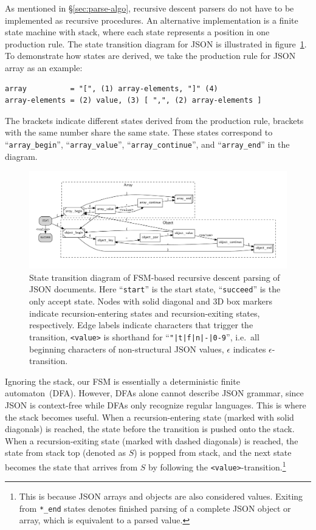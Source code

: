 \documentclass[11pt]{article}
\begin{document}
As mentioned in \S\ref{sec:parse-algo}, recursive descent parsers do not have to be implemented as recursive procedures. An alternative implementation is a finite state machine with stack, where each state represents a position in one production rule. The state transition diagram for JSON is illustrated in figure~\ref{fig:json-fsm}. To demonstrate how states are derived, we take the production rule for JSON array as an example:

\begin{center}
\begin{BVerbatim}  
array          = "[", (1) array-elements, "]" (4)
array-elements = (2) value, (3) [ ",", (2) array-elements ]
\end{BVerbatim}
\end{center}
The brackets indicate different states derived from the production rule, brackets with the same number share the same state. These states correspond to ``\verb|array_begin|'', ``\verb|array_value|'', ``\verb|array_continue|'', and ``\verb|array_end|'' in the diagram.

\begin{figure}
  \includegraphics[width=\linewidth]{figures/json_fsm.pdf}
  \caption{State transition diagram of FSM-based recursive descent parsing of JSON documents. Here ``\texttt{start}'' is the start state, ``\texttt{succeed}'' is the only accept state. Nodes with solid diagonal and 3D box markers indicate recursion-entering states and recursion-exiting states, respectively. Edge labels indicate characters that trigger the transition, \texttt{<value>} is shorthand for ``\texttt{"|t|f|n|-|0-9}'', i.e.\ all beginning characters of non-structural JSON values, $\epsilon$ indicates $\epsilon$-transition.}
  \label{fig:json-fsm}
\end{figure}

Ignoring the stack, our FSM is essentially a deterministic finite automaton~(DFA). However, DFAs alone cannot describe JSON grammar, since JSON is context-free while DFAs only recognize regular languages. This is where the stack becomes useful. When a recursion-entering state (marked with solid diagonals) is reached, the state before the transition is pushed onto the stack. When a recursion-exiting state (marked with dashed diagonals) is reached, the state from stack top (denoted as $S$) is popped from stack, and the next state becomes the state that arrives from $S$ by following the \verb|<value>|-transition.\footnote{This is because JSON arrays and objects are also considered values. Exiting from \verb|*_end| states denotes finished parsing of a complete JSON object or array, which is equivalent to a parsed value.}
\end{document}
